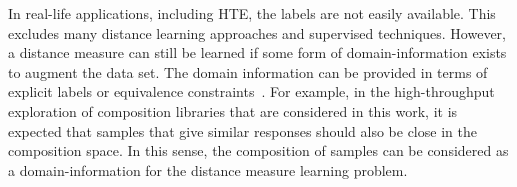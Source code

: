 In real-life applications, including HTE, the labels are not easily available. 
This excludes many distance learning approaches and supervised techniques. 
However, a distance measure can still be learned if some form of domain-information exists to augment the data set. The domain information can be provided in terms of explicit labels or equivalence constraints~\cite{bar2005learning}.
For example, in the high-throughput exploration of composition libraries that are considered in this work, it is expected that samples that give similar responses should also be close in the composition space. 
In this sense, the composition of samples can be considered as a domain-information for the distance measure learning problem.
